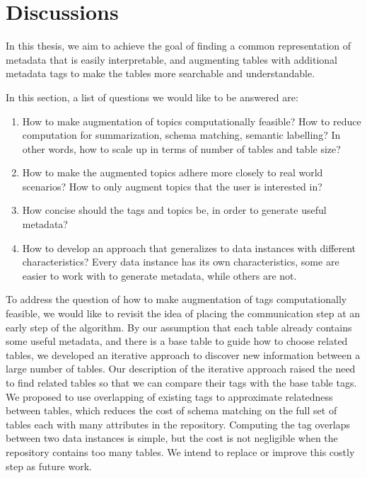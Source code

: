
\chapter{Discussions}
\label{ch:Discussions}

In this thesis, we aim to achieve the goal of finding a common representation of metadata that is easily interpretable, and augmenting tables with additional metadata tags to make the tables more searchable and understandable.

In this section, a list of questions we would like to be answered are:
\begin{enumerate}
\item How to make augmentation of topics computationally feasible? How to reduce computation for summarization, schema matching, semantic labelling? In other words, how to scale up in terms of number of tables and table size?
\item How to make the augmented topics adhere more closely to real world scenarios? How to only augment topics that the user is interested in?
\item How concise should the tags and topics be, in order to generate useful metadata?
\item How to develop an approach that generalizes to data instances with different characteristics? Every data instance has its own characteristics, some are easier to work with to generate metadata, while others are not.	
\end{enumerate}

To address the question of how to make augmentation of tags computationally feasible, we would like to revisit the idea of placing the communication step at an early step of the algorithm. By our assumption that each table already contains some useful metadata, and there is a base table to guide how to choose related tables, we developed an iterative approach to discover new information between a large number of tables. Our description of the iterative approach raised the need to find related tables so that we can compare their tags with the base table tags. We proposed to use overlapping of existing tags to approximate relatedness between tables, which reduces the cost of schema matching on the full set of tables each with many attributes in the repository. Computing the tag overlaps between two data instances is simple, but the cost is not negligible when the repository contains too many tables. We intend to replace or improve this costly step as future work.

